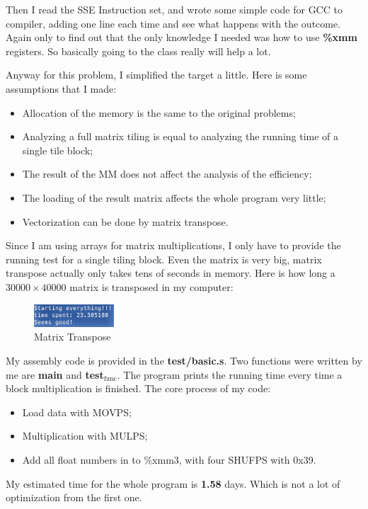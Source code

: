 \documentclass[11pt]{article}
\begin{document}
Then I read the SSE Instruction set, and wrote some simple code for GCC to compiler, adding one line each time and see what happens with the outcome. 
Again only to find out that the only knowledge I needed was how to use \textbf{\%xmm} registers. So basically going to the class really will help a lot. 

Anyway for this problem, I simplified the target a little. Here is some assumptions that I made:
\begin{itemize}
\item Allocation of the memory is the same to the original problems;
\item Analyzing a full matrix tiling is equal to analyzing the running time of a single tile block;
\item The result of the MM does not affect the analysis of the efficiency;
\item The loading of the result matrix affects the whole program very little;
\item Vectorization can be done by matrix transpose.
\end{itemize}

Since I am using arrays for matrix multiplications, I only have to provide the running test for a single tiling block. Even the matrix is very big, 
matrix transpose actually only takes tens of seconds in memory. Here is how long  a \(30000\times 40000\) matrix is transposed in my computer:
\begin{figure}[htb]
\centering
\includegraphics[width=3cm]{./transpose.png}
\caption{\label{fig:orgparagraph4}
Matrix Transpose}
\end{figure}

My assembly code is provided in the \textbf{test/basic.s}. Two functions were written by me are \textbf{main} and \textbf{test\(_{\text{func}}\)}. The program prints
the running time every time a block multiplication is finished. The core process of my code:
\begin{itemize}
\item Load data with MOVPS;
\item Multiplication with MULPS;
\item Add all float numbers in to \%xmm3, with four SHUFPS with 0x39.
\end{itemize}

My estimated time for the whole program is \textbf{1.58} days. Which is not a lot of optimization 
from the first one. 
\end{document}
